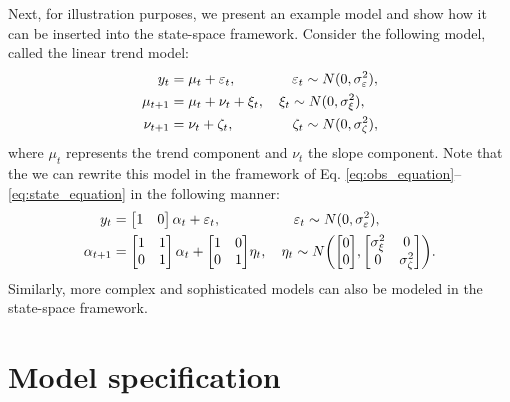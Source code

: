 \documentclass{juliacon}
\begin{document}
Next, for illustration purposes, we present an example model and show how it can be inserted into the state-space framework. Consider the following model, called the linear trend model:
%
\begin{align}
    y_{t} &= \mu_{t} + \varepsilon_{t}, \hspace{0.115\columnwidth} \varepsilon_{t} \sim N(0, \sigma^{2}_{\varepsilon}), \label{eq:lineartrend1} \\
    \mu_{t+1} &= \mu_{t} + \nu_{t} + \xi_{t}, \quad \xi_{t} \sim N(0, \sigma^{2}_{\xi}), \label{eq:lineartrend2} \\
    \nu_{t+1} &= \nu_{t} + \zeta_{t}, \hspace{0.12\columnwidth} \zeta_{t} \sim N(0, \sigma^{2}_{\zeta}), \label{eq:lineartrend3}
\end{align}
%
\noindent where $\mu_{t}$ represents the trend component and $\nu_{t}$ the slope component. Note that the we can rewrite this model in the framework of Eq. \eqref{eq:obs_equation}--\eqref{eq:state_equation} in the following manner:
%
\begin{align}
    y_{t} &= \begin{bmatrix} 1 & 0 \end{bmatrix} \alpha_{t} + \varepsilon_{t}, \hspace{0.15\columnwidth} \varepsilon_{t} \sim N(0, \sigma^{2}_{\varepsilon}), \\
    \alpha_{t+1} &= \begin{bmatrix} 1 & 1 \\ 0 & 1 \end{bmatrix} \alpha_{t} + \begin{bmatrix} 1 & 0 \\ 0 & 1 \end{bmatrix}\!\eta_{t}, \quad \eta_{t} \sim N \bigg(\!\begin{bmatrix} 0 \\ 0 \end{bmatrix}\!, \begin{bmatrix} \sigma^{2}_{\xi} & 0 \\ 0 & \sigma^{2}_{\zeta} \end{bmatrix}\!\bigg).
\end{align}
%
Similarly, more complex and sophisticated models can also be modeled in the state-space framework.

\section{Model specification} \label{sec:modeling}
\end{document}
